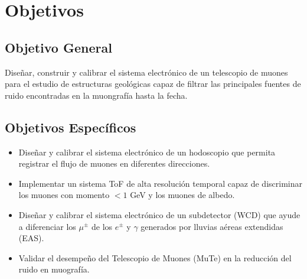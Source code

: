 \chapter{Objetivos}
\section{\textbf{Objetivo General}}

Diseñar, construir y calibrar el sistema electrónico de un telescopio de muones para el estudio de estructuras geológicas capaz de filtrar las principales fuentes de ruido encontradas en la muongrafía hasta la fecha.

\section{\textbf{Objetivos Específicos}}

\begin{itemize}
    \item Diseñar y calibrar el sistema electrónico de un hodoscopio que permita registrar el flujo de muones en diferentes direcciones.
    
    \item  Implementar un sistema ToF de alta resolución temporal capaz de discriminar los muones con momento $< 1$ GeV y los muones de albedo.

    \item  Diseñar y calibrar el sistema electrónico de un subdetector (WCD) que ayude a diferenciar los $\mu^{\pm}$ de los $e^{\pm}$ y $\gamma$ generados por lluvias aéreas extendidas (EAS).
    
    
    
    
    \item Validar el desempeño del Telescopio de Muones (MuTe) en la reducción del ruido en muografía. 
    
    
    
\end{itemize}